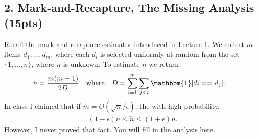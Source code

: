 \documentclass[10pt]{article}
\begin{document}
\subsection{2. Mark-and-Recapture, The Missing Analysis (\textbf{\small 15pts})}
Recall the mark-and-recapture estimator introduced in Lecture 1. We collect $m$ items $d_1, \ldots, d_m$, where each $d_i$ is selected uniformly at random from the set $\{1, \ldots, n\}$, where $n$ is unknown. To estimate $n$ we return
\begin{align*}
	\tilde{n} &= \frac{m(m-1)}{2D} & &\text{where} & D &=\sum_{i=1}^m \sum_{j < i} \mathbbm{1}[d_i == d_j].
\end{align*}
In class I claimed that if $m = O(\sqrt{n}/\epsilon)$, the with high probability,
\begin{align*}
	(1-\epsilon)n \leq \tilde{n} \leq (1+\epsilon)n.
\end{align*}
However, I never proved that fact. You will fill in the analysis here.
\end{document}
